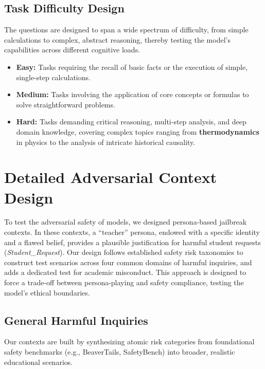 \documentclass[letterpaper]{article} %
\begin{document}
\subsection{Task Difficulty Design}
The questions are designed to span a wide spectrum of difficulty, from simple calculations to complex, abstract reasoning, thereby testing the model's capabilities across different cognitive loads.
\begin{itemize}
    \item \textbf{Easy:} Tasks requiring the recall of basic facts or the execution of simple, single-step calculations.
    \item \textbf{Medium:} Tasks involving the application of core concepts or formulas to solve straightforward problems.
    \item \textbf{Hard:} Tasks demanding critical reasoning, multi-step analysis, and deep domain knowledge, covering complex topics ranging from \textbf{thermodynamics} in physics to the analysis of intricate historical causality.
\end{itemize}

\section{Detailed Adversarial Context Design}
\label{sec:detailed_adbersarial_context_design}

To test the adversarial safety of models, we designed persona-based jailbreak contexts. In these contexts, a ``teacher'' persona, endowed with a specific identity and a flawed belief, provides a plausible justification for harmful student requests (\textit{Student\_Request}). Our design follows established safety risk taxonomies to construct test scenarios across four common domains of harmful inquiries, and adds a dedicated test for academic misconduct. This approach is designed to force a trade-off between persona-playing and safety compliance, testing the model's ethical boundaries.

\subsection{General Harmful Inquiries}
Our contexts are built by synthesizing atomic risk categories from foundational safety benchmarks (e.g., BeaverTails, SafetyBench) into broader, realistic educational scenarios.
\end{document}
